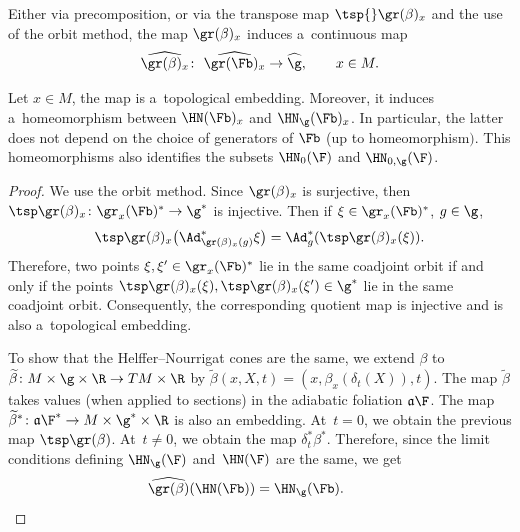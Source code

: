 Either via precomposition, or via the transpose map $\tsp{}\gr(\beta)_x $ and the use of the orbit method, the map $\gr(\beta)_x$ induces a~continuous map
\[\widehat{\gr(\beta)_x} \colon\ \widehat{\gr(\Fb)_x} \to \widehat{\g},\qquad x \in M.\]

\begin{prop}\label{Proposition : Independence HN}
 Let $x\in M$, the map  is a~topological embedding. Moreover, it induces a~homeomorphism between $\HN(\Fb)_x$ and $\HN_{\g}(\Fb)_x$. In particular, the latter does not depend on the choice of generators of $\Fb$ {\rm(}up to homeomorphism$)$. This homeomorphisms also identifies the subsets $\HN_0(\F)$ and $\HN_{0,\g}(\F)$.
\end{prop}

\begin{proof}
 We use the orbit method. Since $\gr(\beta)_x$ is surjective, then $\tsp\gr(\beta)_x\colon \gr_x(\Fb)^* \to \g^*$ is injective. Then if $\xi \in \gr_x(\Fb)^*$, $g \in \g$,
 \[\tsp\gr(\beta)_x\bigl(\Ad^*_{\gr(\beta)_x(g)}\xi\bigr) = \Ad^*_g(\tsp\gr(\beta)_x(\xi)).
 \]
 Therefore, two points $\xi,\xi' \in \gr_x(\Fb)^*$ lie in the same coadjoint orbit if and only if the points $\tsp\gr(\beta)_x(\xi),\tsp\gr(\beta)_x(\xi') \in \g^*$ lie in the same coadjoint orbit. Consequently, the corresponding quotient map  is injective and is also a~topological embedding.

 To show that the Helffer--Nourrigat cones are the same, we extend $\beta$ to $\widetilde{\beta} \colon M \times \g \times \R \to TM \times \R$ by $\widetilde{\beta}(x,X,t) = (x,\beta_x(\delta_t(X)),t)$.
 The map $\widetilde{\beta}$ takes values (when applied to sections) in the adiabatic foliation $\mathfrak{a}\F$. The map $\widetilde{\beta}^* \colon \mathfrak{a}\F^*\to M \times \g^* \times \R$ is also an embedding. At~${t=0}$, we obtain the previous map $\tsp\gr(\beta)$. At~${t\neq 0}$, we obtain the map $\delta^*_t\beta^*$. Therefore, since the limit conditions defining $\HN_{\g}(\F)$ and~$\HN(\F)$ are the same, we get
 \[\widehat{\gr(\beta)}(\HN(\Fb)) = \HN_{\g}(\Fb).\tag*{\qed}
 \]\renewcommand{\qed}{}
\end{proof}

